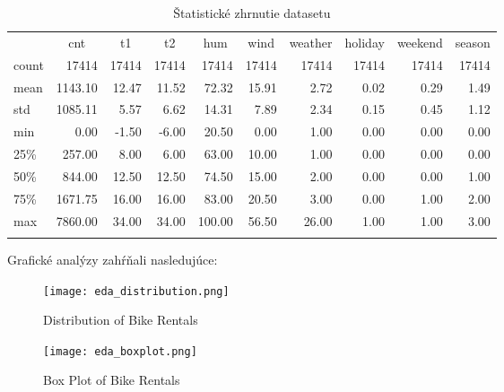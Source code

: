 \newpage

\begin{table}[ht!]
\centering
\caption{Štatistické zhrnutie datasetu}\label{t:stats}
\medskip
\small
\begin{tabular}{||l||r|r|r|r|r|r|r|r|r||}
\hhline{|t:==t:========:t|}
\multicolumn{1}{||c||}{Štatistika} & \multicolumn{1}{c|}{cnt} & \multicolumn{1}{c|}{t1} & \multicolumn{1}{c|}{t2} & \multicolumn{1}{c|}{hum} & \multicolumn{1}{c|}{wind} & \multicolumn{1}{c|}{weather} & \multicolumn{1}{c|}{holiday} & \multicolumn{1}{c|}{weekend} & \multicolumn{1}{c||}{season} \\
\hhline{|:==:========:|}
count & 17414 & 17414 & 17414 & 17414 & 17414 & 17414 & 17414 & 17414 & 17414 \\
\hhline{||-|-|-|-|-|-|-|-|-|-||}
mean & 1143.10 & 12.47 & 11.52 & 72.32 & 15.91 & 2.72 & 0.02 & 0.29 & 1.49 \\
\hhline{||-|-|-|-|-|-|-|-|-|-||}
std & 1085.11 & 5.57 & 6.62 & 14.31 & 7.89 & 2.34 & 0.15 & 0.45 & 1.12 \\
\hhline{||-|-|-|-|-|-|-|-|-|-||}
min & 0.00 & -1.50 & -6.00 & 20.50 & 0.00 & 1.00 & 0.00 & 0.00 & 0.00 \\
\hhline{||-|-|-|-|-|-|-|-|-|-||}
25\% & 257.00 & 8.00 & 6.00 & 63.00 & 10.00 & 1.00 & 0.00 & 0.00 & 0.00 \\
\hhline{||-|-|-|-|-|-|-|-|-|-||}
50\% & 844.00 & 12.50 & 12.50 & 74.50 & 15.00 & 2.00 & 0.00 & 0.00 & 1.00 \\
\hhline{||-|-|-|-|-|-|-|-|-|-||}
75\% & 1671.75 & 16.00 & 16.00 & 83.00 & 20.50 & 3.00 & 0.00 & 1.00 & 2.00 \\
\hhline{||-|-|-|-|-|-|-|-|-|-||}
max & 7860.00 & 34.00 & 34.00 & 100.00 & 56.50 & 26.00 & 1.00 & 1.00 & 3.00 \\
\hhline{|b:==b:========:b|}
\end{tabular}
\end{table}

Grafické analýzy zahŕňali nasledujúce:

\begin{figure}[ht!]
\centering
\texttt{[image: eda\_distribution.png]}
\caption{Distribution of Bike Rentals}\label{o:2}
\end{figure}

\begin{figure}[ht!]
\centering
\texttt{[image: eda\_boxplot.png]}
\caption{Box Plot of Bike Rentals}\label{o:2}
\end{figure}

